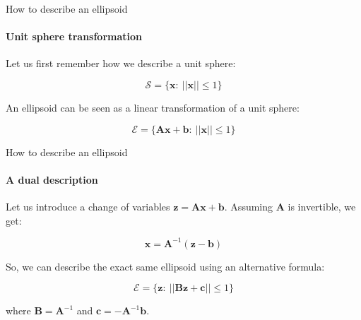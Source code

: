 \documentclass{beamer}
\begin{document}
\begin{frame}{How to describe an ellipsoid}
\framesubtitle{Unit sphere transformation}
\begin{flushleft}

Let us first remember how we describe a unit sphere:

\begin{equation}
    \mathcal{S} = \{ \mathbf{x}: \ || \mathbf{x} || \leq 1 \}
\end{equation}

An ellipsoid can be seen as a linear transformation of a unit sphere: 

\begin{equation}
    \mathcal{E} = \{ \mathbf{A}\mathbf{x} + \mathbf{b}: \ || \mathbf{x} || \leq 1 \}
\end{equation}
 
\end{flushleft}
\end{frame}


\begin{frame}{How to describe an ellipsoid}
\framesubtitle{A dual description}
\begin{flushleft}

Let us introduce a change of variables $\mathbf{z} = \mathbf{A}\mathbf{x} + \mathbf{b}$. Assuming $\mathbf{A}$ is invertible, we get:

\begin{equation}
    \mathbf{x} = \mathbf{A}^{-1}(\mathbf{z} - \mathbf{b})
\end{equation}

So, we can describe the exact same ellipsoid using an alternative formula: 

\begin{equation}
    \mathcal{E} = \{ \mathbf{z}: \ || \mathbf{B}\mathbf{z} + \mathbf{c} || \leq 1 \}
\end{equation}
 
 where $\mathbf{B} = \mathbf{A}^{-1}$ and $\mathbf{c} = -\mathbf{A}^{-1}\mathbf{b}$.
 
\end{flushleft}
\end{frame}
\end{document}
